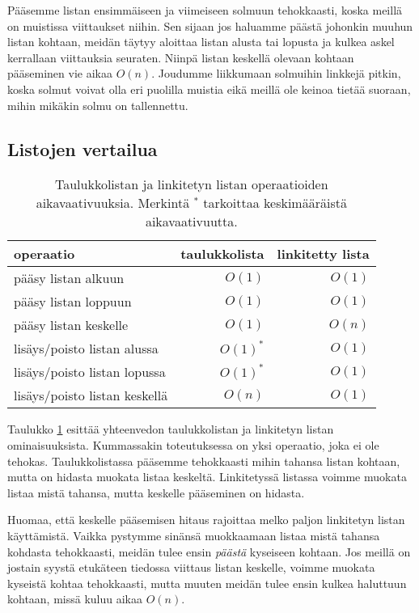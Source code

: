 Pääsemme listan ensimmäiseen ja viimeiseen solmuun tehokkaasti,
koska meillä on muistissa viittaukset niihin.
Sen sijaan jos haluamme päästä johonkin muuhun listan kohtaan,
meidän täytyy aloittaa listan alusta tai lopusta ja kulkea askel
kerrallaan viittauksia seuraten.
Niinpä listan keskellä olevaan kohtaan pääseminen vie aikaa $O(n)$.
Joudumme liikkumaan solmuihin linkkejä pitkin, koska solmut voivat
olla eri puolilla muistia eikä meillä ole keinoa tietää suoraan,
mihin mikäkin solmu on tallennettu.

\subsection{Listojen vertailua}

\begin{table}
\center
\begin{tabular}{lrr}
operaatio & taulukkolista & linkitetty lista \\
\hline
pääsy listan alkuun & $O(1)$ & $O(1)$ \\
pääsy listan loppuun & $O(1)$ & $O(1)$ \\ 
pääsy listan keskelle &  $O(1)$ & $O(n)$ \\
lisäys/poisto listan alussa & $O(1)^*$ & $O(1)$ \\
lisäys/poisto listan lopussa & $O(1)^*$ & $O(1)$ \\ 
lisäys/poisto listan keskellä &  $O(n)$ & $O(1)$ \\
\end{tabular}
\caption{Taulukkolistan ja linkitetyn listan operaatioiden
aikavaativuuksia. Merkintä $^*$ tarkoittaa keskimääräistä aikavaativuutta.}
\label{tab:taulin}
\end{table}

Taulukko \ref{tab:taulin} esittää yhteenvedon taulukkolistan ja
linkitetyn listan ominaisuuksista.
Kummassakin toteutuksessa on yksi operaatio,
joka ei ole tehokas.
Taulukkolistassa pääsemme tehokkaasti mihin tahansa listan
kohtaan, mutta on hidasta muokata listaa keskeltä.
Linkitetyssä listassa voimme muokata listaa mistä tahansa,
mutta keskelle pääseminen on hidasta.

Huomaa, että keskelle pääsemisen hitaus rajoittaa melko paljon
linkitetyn listan käyttämistä.
Vaikka pystymme sinänsä muokkaamaan listaa mistä tahansa kohdasta
tehokkaasti, meidän tulee ensin \emph{päästä} kyseiseen kohtaan.
Jos meillä on jostain syystä etukäteen tiedossa viittaus listan keskelle,
voimme muokata kyseistä kohtaa tehokkaasti,
mutta muuten meidän tulee ensin kulkea haluttuun kohtaan,
missä kuluu aikaa $O(n)$.

